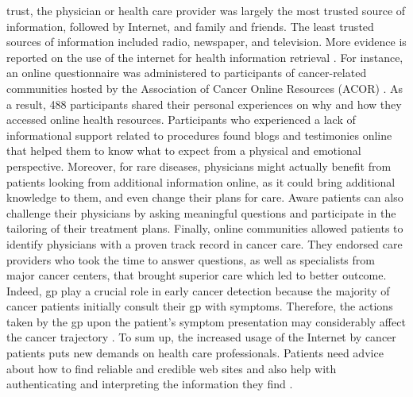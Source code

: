 trust, the physician or health care provider was largely the most trusted source
of information, followed by Internet, and family and friends. The least trusted
sources of information included radio, newspaper, and television.
More evidence is reported on the use of the internet for health information
retrieval
\cite{chen_impact_2001,pereira_internet_2000,ziebland_how_2004,dolce_internet_2011}.
For instance, an online questionnaire was administered to participants of
cancer-related communities hosted by the Association of Cancer Online Resources
(ACOR) \cite{dolce_internet_2011}. As a result, 488 participants shared their
personal experiences on why and how they accessed online health resources.
Participants who experienced a lack of informational support related to
procedures found blogs and testimonies online that helped them to know what to
expect from a physical and emotional perspective. Moreover, for rare diseases,
physicians might actually benefit from patients looking from additional
information online, as it could bring additional knowledge to them, and even
change their plans for care. Aware patients can also challenge their physicians
by asking meaningful questions and participate in the tailoring of their
treatment plans. Finally, online communities allowed patients to identify
physicians with a proven track record in cancer care. They endorsed care
providers who took the time to answer questions, as well as specialists from
major cancer centers, that brought superior care which led to better outcome.
Indeed, \ac{gp} play a crucial role in early cancer detection because the
majority of cancer patients initially consult their \ac{gp} with symptoms.
Therefore, the actions taken by the \ac{gp} upon the patient's symptom
presentation may considerably affect the cancer trajectory
\cite{flytkjaer_virgilsen_cancer_2019}. To sum up, the increased usage of the
Internet by cancer patients puts new demands on health care professionals.
Patients need advice about how to find reliable and credible web sites and also
help with authenticating and interpreting the information they find
\cite{carlsson_cancer_2009}.


